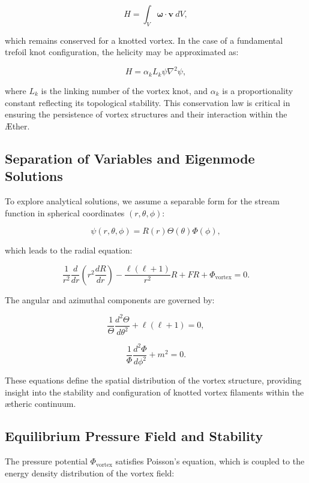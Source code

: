 \begin{equation*}
H = \int_V \boldsymbol{\omega} \cdot \mathbf{v} \ dV,
\end{equation*}

which remains conserved for a knotted vortex. In the case of a fundamental trefoil knot configuration, the helicity may be approximated as:

\begin{equation*}
H = \alpha_k L_k \psi \nabla^2 \psi,
\end{equation*}

where $L_k$ is the linking number of the vortex knot, and $\alpha_k$ is a proportionality constant reflecting its topological stability. This conservation law is critical in ensuring the persistence of vortex structures and their interaction within the Æther.

\subsection{Separation of Variables and Eigenmode Solutions}
To explore analytical solutions, we assume a separable form for the stream function in spherical coordinates $(r, \theta, \phi)$:

\begin{equation*}
\psi(r, \theta, \phi) = R(r) \Theta(\theta) \Phi(\phi),
\end{equation*}

which leads to the radial equation:

\begin{equation*}
\frac{1}{r^2} \frac{d}{dr} \left( r^2 \frac{dR}{dr} \right) - \frac{\ell (\ell+1)}{r^2} R + F R + \Phi_\text{vortex} = 0.
\end{equation*}

The angular and azimuthal components are governed by:

\begin{equation*}
\frac{1}{\Theta} \frac{d^2\Theta}{d\theta^2} + \ell(\ell+1) = 0,
\end{equation*}

\begin{equation*}
\frac{1}{\Phi} \frac{d^2\Phi}{d\phi^2} + m^2 = 0.
\end{equation*}

These equations define the spatial distribution of the vortex structure, providing insight into the stability and configuration of knotted vortex filaments within the ætheric continuum.

\subsection{Equilibrium Pressure Field and Stability}
The pressure potential $\Phi_\text{vortex}$ satisfies Poisson's equation, which is coupled to the energy density distribution of the vortex field:

